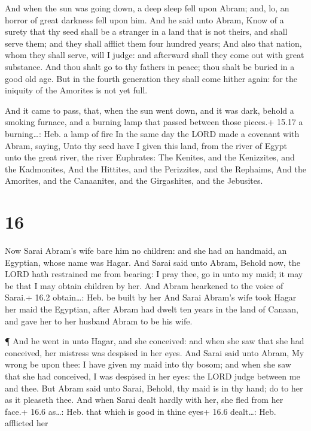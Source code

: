  And when the sun was going down, a deep sleep fell upon
Abram; and, lo, an horror of great darkness fell upon him. 
And he said unto Abram, Know of a surety that thy seed shall be a
stranger in a land that is not theirs, and shall serve them; and they
shall afflict them four hundred years;  And also that
nation, whom they shall serve, will I judge: and afterward shall they
come out with great substance.  And thou shalt go to thy
fathers in peace; thou shalt be buried in a good old age. 
But in the fourth generation they shall come hither again: for the
iniquity of the Amorites is not yet full.

 And it came to pass, that, when the sun went down, and it
was dark, behold a smoking furnace, and a burning lamp that passed
between those pieces.+ 15.17 a burning\ldots: Heb. a lamp of fire
 In the same day the LORD made a covenant with Abram,
saying, Unto thy seed have I given this land, from the river of Egypt
unto the great river, the river Euphrates:  The Kenites,
and the Kenizzites, and the Kadmonites,  And the Hittites,
and the Perizzites, and the Rephaims,  And the Amorites,
and the Canaanites, and the Girgashites, and the Jebusites.

\hypertarget{section-15}{%
\section{16}\label{section-15}}

 Now Sarai Abram's wife bare him no children: and she had an
handmaid, an Egyptian, whose name was Hagar.  And Sarai said
unto Abram, Behold now, the LORD hath restrained me from bearing: I pray
thee, go in unto my maid; it may be that I may obtain children by her.
And Abram hearkened to the voice of Sarai.+ 16.2 obtain\ldots: Heb. be
built by her  And Sarai Abram's wife took Hagar her maid the
Egyptian, after Abram had dwelt ten years in the land of Canaan, and
gave her to her husband Abram to be his wife.

 ¶ And he went in unto Hagar, and she conceived: and when
she saw that she had conceived, her mistress was despised in her eyes.
 And Sarai said unto Abram, My wrong be upon thee: I have
given my maid into thy bosom; and when she saw that she had conceived, I
was despised in her eyes: the LORD judge between me and thee.
 But Abram said unto Sarai, Behold, thy maid is in thy hand;
do to her as it pleaseth thee. And when Sarai dealt hardly with her, she
fled from her face.+ 16.6 as\ldots: Heb. that which is good in thine
eyes+ 16.6 dealt\ldots: Heb. afflicted her

